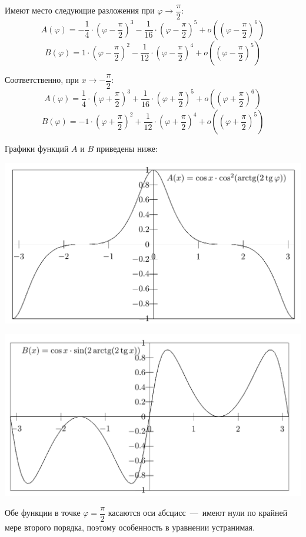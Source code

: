 \documentclass[2pt, a4paper, fleqn]{extarticle}
\begin{document}
Имеют место следующие разложения при $\varphi\rightarrow\dfrac{\pi}{2}$: $$A(\varphi)=-\dfrac{1}{4}\cdot\left(\varphi-\dfrac{\pi}{2}\right)^3-\dfrac{1}{16}\cdot\left(\varphi-\dfrac{\pi}{2}\right)^5+o\left(\left(\varphi-\dfrac{\pi}{2}\right)^6\right)$$ $$B(\varphi) = 1\cdot\left(\varphi-\dfrac{\pi}{2}\right)^2-\dfrac{1}{12}\cdot \left(\varphi-\dfrac{\pi}{2}\right)^4+o\left(\left(\varphi-\dfrac{\pi}{2}\right)^5\right)$$

Соответственно, при $x\rightarrow-\dfrac{\pi}{2}$: $$A(\varphi)=\dfrac{1}{4}\cdot\left(\varphi+\dfrac{\pi}{2}\right)^3+\dfrac{1}{16}\cdot\left(\varphi+\dfrac{\pi}{2}\right)^5+o\left(\left(\varphi+\dfrac{\pi}{2}\right)^6\right)$$ $$B(\varphi) = -1\cdot\left(\varphi+\dfrac{\pi}{2}\right)^2+\dfrac{1}{12}\cdot \left(\varphi+\dfrac{\pi}{2}\right)^4+o\left(\left(\varphi+\dfrac{\pi}{2}\right)^5\right)$$


Графики функций $A$ и $B$ приведены ниже: 

\includegraphics[scale=0.25]{A}

\includegraphics[scale=0.25]{B}

Обе функции в точке $\varphi = \dfrac{\pi}{2}$ касаются оси абсцисс~---~имеют нули по крайней мере второго порядка, поэтому особенность в уравнении устранимая.
\end{document}
